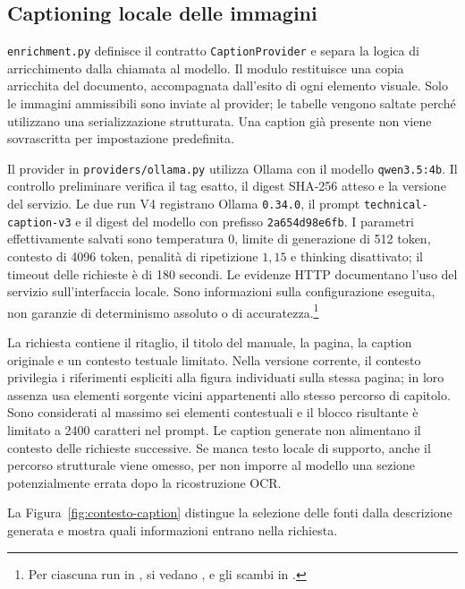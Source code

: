\subsection{Captioning locale delle immagini}

\texttt{enrichment.py} definisce il contratto \texttt{CaptionProvider} e separa la logica di arricchimento dalla chiamata al modello. Il modulo restituisce una copia arricchita del documento, accompagnata dall'esito di ogni elemento visuale. Solo le immagini ammissibili sono inviate al provider; le tabelle vengono saltate perché utilizzano una serializzazione strutturata. Una caption già presente non viene sovrascritta per impostazione predefinita.

Il provider in \texttt{providers/ollama.py} utilizza Ollama con il modello \texttt{qwen3.5:4b}. Il controllo preliminare verifica il tag esatto, il digest SHA-256 atteso e la versione del servizio. Le due run V4 registrano Ollama \texttt{0.34.0}, il prompt \texttt{technical-caption-v3} e il digest del modello con prefisso \texttt{2a654d98e6fb}. I parametri effettivamente salvati sono temperatura $0$, limite di generazione di 512 token, contesto di 4096 token, penalità di ripetizione $1{,}15$ e thinking disattivato; il timeout delle richieste è di 180 secondi. Le evidenze HTTP documentano l'uso del servizio sull'interfaccia locale. Sono informazioni sulla configurazione eseguita, non garanzie di determinismo assoluto o di accuratezza.\footnote{\raggedright Per ciascuna run in , si vedano ,  e gli scambi in .}

La richiesta contiene il ritaglio, il titolo del manuale, la pagina, la caption originale e un contesto testuale limitato. Nella versione corrente, il contesto privilegia i riferimenti espliciti alla figura individuati sulla stessa pagina; in loro assenza usa elementi sorgente vicini appartenenti allo stesso percorso di capitolo. Sono considerati al massimo sei elementi contestuali e il blocco risultante è limitato a 2400 caratteri nel prompt. Le caption generate non alimentano il contesto delle richieste successive. Se manca testo locale di supporto, anche il percorso strutturale viene omesso, per non imporre al modello una sezione potenzialmente errata dopo la ricostruzione OCR.

La Figura~\ref{fig:contesto-caption} distingue la selezione delle fonti dalla descrizione generata e mostra quali informazioni entrano nella richiesta.

